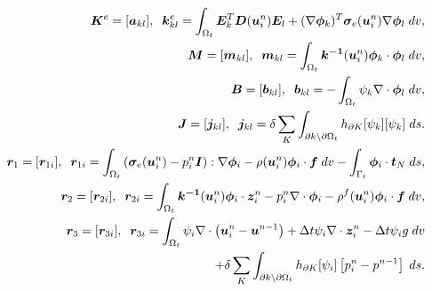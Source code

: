  \begin{eqnarray*}
&&\boldsymbol{K}^{e}=[\boldsymbol{a}_{kl}], \;\; \boldsymbol{k}^{e}_{kl}=\int_{{\Omega_{t} }} \boldsymbol{E}^{T}_{k}\boldsymbol{D}(\boldsymbol{u}^{n}_{i})\boldsymbol{E}_{l}+  (\nabla \boldsymbol{\phi}_{k})^{T}\boldsymbol{\sigma}_{e}(\boldsymbol{u}^{n}_{i})\nabla \boldsymbol{\phi}_{l}  \; dv, \\
&&\boldsymbol{M}=[\boldsymbol{m}_{kl}], \;\; \boldsymbol{m}_{kl}
 =  \int_{{\Omega_{t} }} \perminv(\boldsymbol{u}^{n}_{i})  \boldsymbol{\phi}_{k} \cdot  \boldsymbol{\phi}_{l} \; dv, \\
&&\boldsymbol{B}=[\boldsymbol{b}_{kl}], \;\; \boldsymbol{b}_{kl}
 = -\int_{{\Omega_{t} }}  {\psi}_{k} \nabla \cdot \boldsymbol{\phi}_{l} \; dv, \\
&& \boldsymbol{J}=[\boldsymbol{j}_{kl}], \;\; \boldsymbol{j}_{kl}
= \delta \sum_{K} \int_{\partial k \backslash \partial {\Omega_{t} }} h_{\partial K} [{\psi}_{k}][{\psi}_{k}] \;ds. \\
&& \boldsymbol{r}_{1} = [\boldsymbol{r}_{1i}], \;\; \boldsymbol{r}_{1i}
=  \int_{{\Omega_{t}}} \left(\boldsymbol{\sigma}_{e}(\boldsymbol{u}^{n}_{i})-p^{n}_{i} \boldsymbol{I} \right) : \nabla \boldsymbol{\phi}_{i}
- {\rho}(\boldsymbol{u}^{n}_{i})  \boldsymbol{\phi}_{i}\cdot \boldsymbol{f}  \; dv - \int_{\Gamma_{t}}    \boldsymbol{\phi}_{i} \cdot \boldsymbol{t}_{N}    \; ds, \\
&& \boldsymbol{r}_{2} = [\boldsymbol{r}_{2i}], \;\; \boldsymbol{r}_{2i}= \int_{{\Omega_{t}}}  \perminv(\boldsymbol{u}^{n}_{i}) \boldsymbol{\phi}_{i} \cdot \boldsymbol{z}^{n}_{i}  -{p}^{n}_{i} \nabla \cdot \boldsymbol{\phi}_{i} -{\rho^{f}}(\boldsymbol{u}^{n}_{i}) \boldsymbol{\phi}_{i}\cdot \boldsymbol{f}  \; dv , \\
&& \boldsymbol{r}_{3} = [\boldsymbol{r}_{3i}], \;\; \boldsymbol{r}_{3i}= \int_{{\Omega_{t}}}  {\psi}_{i}   \nabla \cdot  \left( {\boldsymbol{u}^{n}_{i}-\boldsymbol{u}^{n-1}} \right)
+  \Delta t {\psi}_{i}  \nabla \cdot \boldsymbol{z}^{n}_{i}   - \Delta t{\psi}_{i} g  \; dv  \\
&& \hskip 5cm + \delta \sum_{K} \int_{\partial k \backslash \partial {\Omega_{t} }} h_{\partial K} [{\psi}_{i}]\left[{{p}^{n}_{i}-{p}^{n-1}}\right] \;ds.
 \end{eqnarray*}
